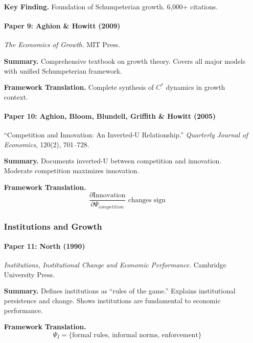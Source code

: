 \textbf{Key Finding.}
Foundation of Schumpeterian growth. 6,000+ citations.

\paragraph{Paper 9: Aghion \& Howitt (2009)}

\textit{The Economics of Growth.}
MIT Press.

\textbf{Summary.}
Comprehensive textbook on growth theory. Covers all major models with 
unified Schumpeterian framework.

\textbf{Framework Translation.}
Complete synthesis of $C^*$ dynamics in growth context.

\paragraph{Paper 10: Aghion, Bloom, Blundell, Griffith \& Howitt (2005)}

``Competition and Innovation: An Inverted-U Relationship.''
\textit{Quarterly Journal of Economics}, 120(2), 701--728.

\textbf{Summary.}
Documents inverted-U between competition and innovation. Moderate competition 
maximizes innovation.

\textbf{Framework Translation.}
\begin{equation}
\frac{\partial \text{Innovation}}{\partial \Psi_{competition}} \text{ changes sign}
\end{equation}

\subsubsection{Institutions and Growth}

\paragraph{Paper 11: North (1990)}

\textit{Institutions, Institutional Change and Economic Performance.}
Cambridge University Press.

\textbf{Summary.}
Defines institutions as ``rules of the game.'' Explains institutional persistence 
and change. Shows institutions are fundamental to economic performance.

\textbf{Framework Translation.}
\begin{equation}
\Psi_I = \{\text{formal rules, informal norms, enforcement}\}
\end{equation}

